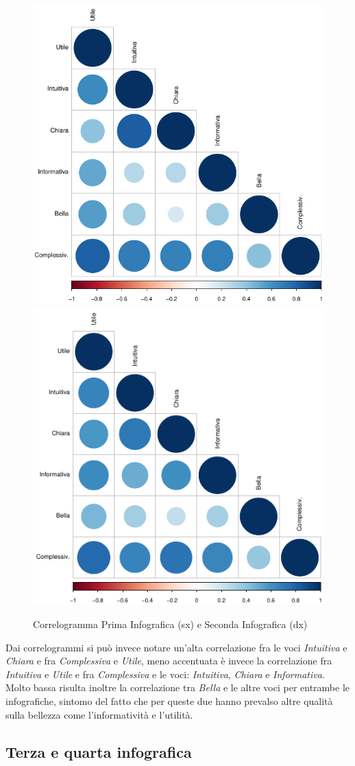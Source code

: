 \begin{figure}[h]
			\centering
			\includegraphics[width=0.4\linewidth]{imgs/corrVIS1.png}
			\includegraphics[width=0.4\linewidth]{imgs/corrVIS2.png}
			\caption{Correlogramma Prima Infografica (sx) e Seconda Infografica (dx)}
			\label{fig:Terza infografica1}
		\end{figure}
		

Dai correlogrammi si può invece notare un'alta correlazione fra le voci \textit{Intuitiva} e \textit{Chiara} e fra \textit{Complessiva} e \textit{Utile}, meno accentuata è invece la correlazione fra \textit{Intuitiva} e \textit{Utile} e fra \textit{Complessiva} e le voci: \textit{Intuitiva}, \textit{Chiara} e \textit{Informativa}. Molto bassa risulta inoltre la correlazione tra \textit{Bella} e le altre voci per entrambe le infografiche, sintomo del fatto che per queste due hanno prevalso altre qualità sulla bellezza come l'informatività e l'utilità.


\subsection{Terza e quarta infografica}

